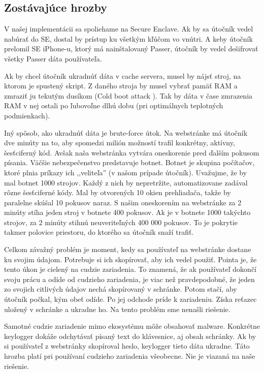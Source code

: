 \subsection{Zostávajúce hrozby}
\label{hrozby}
V našej implementácii sa spoliehame na Secure Enclave. Ak by sa útočník vedel nabúrať do SE, dostal by prístup ku všetkým kľúčom vo vnútri. A keby útočník prelomil SE iPhone-u, ktorý má nainštalovaný Passer, útočník by vedel dešifrovať všetky Passer dáta používateľa.

Ak by chcel útočník ukradnúť dáta v cache servera, musel by nájsť stroj, na ktorom je spustený skript. Z daného stroja by musel vybrať pamäť RAM a zmraziť ju tekutým dusíkom (Cold boot attack \cite{coldboot}). Tak by dáta v čase zmrazenia RAM v nej ostali po ľubovoľne dlhú dobu (pri optimálnych teplotných podmienkach). 

Iný spôsob, ako ukradnúť dáta je brute-force útok. Na webstránke má útočník dve minúty na to, aby spomedzi milión možností trafil konkrétny, aktívny, šesťciferný kód. Avšak naša webstránka vytvára oneskorenie pred ďalším pokusom písania. Väčšie nebezpečenstvo predstavuje botnet. Botnet je skupina počítačov, ktoré plnia príkazy ich ,,veliteľa'' (v našom prípade útočník). Uvažujme, že by mal botnet 1000 strojov. Každý z nich by nepretržite, automatizovane zadával rôzne šesťciferné kódy. Mal by otvorených 10 okien prehliadača, takže by paralelne skúšal 10 pokusov naraz. S našim oneskorením na webstránke za 2 minúty stíha jeden stroj v botnete 400 pokusov. Ak je v botnete 1000 takýchto strojov, za 2 minúty stihnú neuveriteľných 400 000 pokusov. To je pokrytie takmer polovice priestoru, do ktorého sa útočník snaží trafiť. 

Celkom závažný problém je moment, kedy sa používateľ na webstránke dostane ku svojim údajom. Potrebuje si ich skopírovať, aby ich vedel použiť. Pointa je, že tento úkon je cielený na cudzie zariadenia. To znamená, že ak používateľ dokončí svoju prácu a odíde od cudzieho zariadenia, je viac než pravdepodobné, že jeden zo svojich citlivých údajov nechá skopírovaný v schránke. Potom stačí, aby útočník počkal, kým obeť odíde. Po jej odchode príde k zariadeniu. Získa reťazec uložený v schránke a ukradne ho. Na tento problém sme nenašli riešenie.

Samotné cudzie zariadenie mimo ekosystému môže obsahovať malware. Konkrétne keylogger dokáže odchytávať písaný text do klávesnice, aj obsah schránky. Ak by si používateľ z webstránky skopíroval heslo, keylogger tieto dáta ukradne. Táto hrozba platí pri používaní cudzieho zariadenia všeobecne. Nie je viazaná na naše riešenie.



